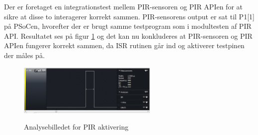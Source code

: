 
Der er foretaget en integrationstest mellem PIR-sensoren og PIR APIen for at sikre at disse to interagerer korrekt sammen. PIR-sensorens output er sat til P1[1] på PSoCen, hvorefter der er brugt samme testprogram som i modultesten af PIR API. Resultatet ses på figur \ref{lab:test_maaling1} og det kan nu konkluderes at PIR-sensoren og PIR APIen fungerer korrekt sammen, da ISR rutinen går ind og aktiverer testpinen der måles på.

\begin{figure}[H]
\centering
{\includegraphics[width=0.60\textwidth]{filer/modultest/billeder/pir_testmaaling}}
\caption{Analysebilledet for PIR aktivering}
\label{lab:test_maaling1}
\end{figure}  
